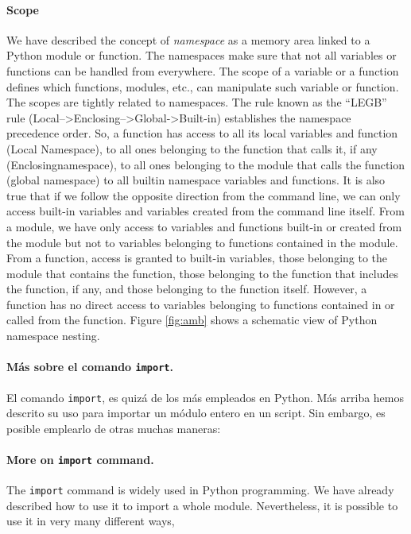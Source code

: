 \begin{paracol}{2}
\paragraph{Scope}  We have described the concept of \emph{namespace} as a memory area linked to a Python module or function. The namespaces make sure that not all variables or functions can be handled from everywhere. The scope of a variable or a function defines which functions, modules, etc., can manipulate such variable or function. The scopes are tightly related to namespaces. The rule known as the ``LEGB'' rule (Local--\textgreater Enclosing--\textgreater Global-\textgreater Built-in) establishes the namespace precedence order. So, a function has access to all its local variables and function (Local Namespace), to all ones belonging to the function that calls it, if any  (Enclosingnamespace), to all ones belonging to the module that calls the function (global namespace) to all builtin namespace variables and functions. It is also true that if we follow the opposite direction from the command line, we can only access built-in variables and variables created from the command line itself. From a module, we have only access to variables and functions built-in or created from the module but not to variables belonging to functions contained in the module.
From a function, access is granted to built-in variables, those belonging to the module that contains the function, those belonging to the function that includes the function, if any, and those belonging to the function itself. However, a function has no direct access to variables belonging to functions contained in or called from the function.
Figure \ref{fig:amb} shows a schematic view of Python namespace nesting.
\switchcolumn
\paragraph{Más sobre el comando \texttt{import}.} El comando \texttt{import}, es quizá de los más empleados en Python. Más arriba hemos descrito su uso para importar un módulo entero en un script. Sin embargo, es posible emplearlo de otras muchas maneras:
\switchcolumn
\paragraph{More on \texttt{import} command.} The \texttt{import} command is widely used in Python programming. We have already described how to use it to import a whole module. Nevertheless, it is possible to use it in very many different ways,
\end{paracol}

